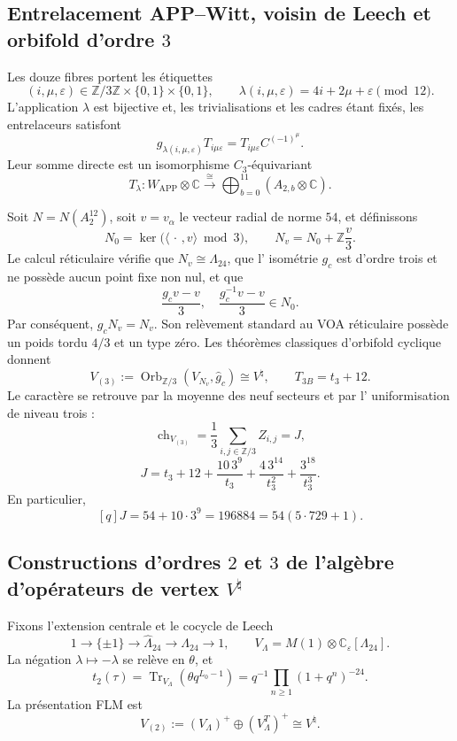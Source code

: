 \subsection{Entrelacement APP--Witt, voisin de Leech et orbifold d'ordre \(3\)}

Les douze fibres portent les étiquettes
\[
 (i,\mu,\varepsilon)\in
 \mathbb Z/3\mathbb Z\times\{0,1\}\times\{0,1\},
 \qquad
 \lambda(i,\mu,\varepsilon)=4i+2\mu+\varepsilon\pmod{12}.
\]
L'application \(\lambda\) est bijective et, les trivialisations et les cadres étant fixés,
les entrelaceurs satisfont
\[
 g_{\lambda(i,\mu,\varepsilon)}T_{i\mu\varepsilon}
 =T_{i\mu\varepsilon}C^{(-1)^\mu}.
\]
Leur somme directe est un isomorphisme \(C_3\)-équivariant
\[
 T_\lambda:W_{\mathrm{APP}}\otimes\mathbb C
 \xrightarrow{\ \cong\ }
 \bigoplus_{b=0}^{11}(A_{2,b}\otimes\mathbb C).
\]

Soit \(N=N(A_2^{12})\), soit \(v=v_\alpha\) le vecteur radial de norme \(54\),
et définissons
\[
 N_0=\ker\bigl(\langle\,\cdot\,,v\rangle\bmod3\bigr),
 \qquad N_v=N_0+\mathbb Z\frac v3.
\]
Le calcul réticulaire vérifie que \(N_v\cong\Lambda_{24}\), que l'
isométrie \(g_c\) est d'ordre trois et ne possède aucun point fixe non nul, et que
\[
 \frac{g_cv-v}{3},\quad\frac{g_c^{-1}v-v}{3}\in N_0.
\]
Par conséquent, \(g_cN_v=N_v\). Son relèvement standard au VOA réticulaire possède un poids
tordu \(4/3\) et un type zéro. Les théorèmes classiques d'orbifold cyclique donnent
\[
 V_{(3)}:=\operatorname{Orb}_{\mathbb Z/3}
       (V_{N_v},\widehat g_c)\cong V^\natural,
 \qquad T_{3B}=t_3+12.
\]
Le caractère se retrouve par la moyenne des neuf secteurs et par l'
uniformisation de niveau trois :
\[
 \operatorname{ch}_{V_{(3)}}
 =\frac13\sum_{i,j\in\mathbb Z/3}Z_{i,j}=J,
\]
\[
 J=t_3+12+\frac{10\,3^9}{t_3}
       +\frac{4\,3^{14}}{t_3^2}+\frac{3^{18}}{t_3^3}.
\]
En particulier,
\[
 [q]J=54+10\cdot3^9=196884=54(5\cdot729+1).
\]

\subsection{Constructions d'ordres \(2\) et \(3\) de l'algèbre d'opérateurs de vertex \texorpdfstring{\(V^\natural\)}{V natural}}

Fixons l'extension centrale et le cocycle de Leech
\[
 1\longrightarrow\{\pm1\}\longrightarrow\widehat\Lambda_{24}
 \longrightarrow\Lambda_{24}\longrightarrow1,
 \qquad
 V_\Lambda=M(1)\otimes\mathbb C_\varepsilon[\Lambda_{24}].
\]
La négation \(\lambda\mapsto-\lambda\) se relève en \(\theta\), et
\[
 t_2(\tau)=\operatorname{Tr}_{V_\Lambda}
  \left(\theta q^{L_0-1}\right)
 =q^{-1}\prod_{n\ge1}(1+q^n)^{-24}.
\]
La présentation FLM est
\[
 V_{(2)}:=(V_\Lambda)^+\oplus(V_\Lambda^T)^+\cong V^\natural.
\]

